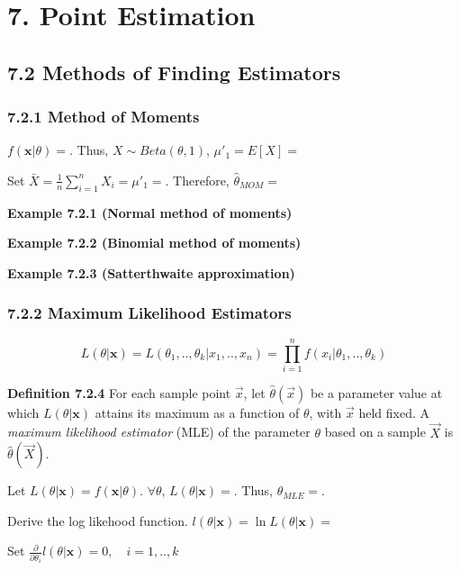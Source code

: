 \documentclass[6pt,Portrait]{article}
\begin{document}
\hypertarget{point-estimation}{%
\section{7. Point Estimation}\label{point-estimation}}

\hypertarget{methods-of-finding-estimators}{%
\subsection{7.2 Methods of Finding
Estimators}\label{methods-of-finding-estimators}}

\hypertarget{MOM}{%
\subsubsection{7.2.1 Method of Moments}\label{MOM}}

\(f(\mathbf{x}|\theta)=\). Thus, \(X\sim Beta(\theta,1)\),
\(\mu'_1=E[X]=\)

Set \(\bar X=\frac1n\sum_{i=1}^nX_i=\mu'_1=\). Therefore,
\(\hat\theta_{MOM}=\)

\textbf{Example 7.2.1 (Normal method of moments)}

\textbf{Example 7.2.2 (Binomial method of moments)}

\textbf{Example 7.2.3 (Satterthwaite approximation)}

\hypertarget{MLE}{%
\subsubsection{7.2.2 Maximum Likelihood Estimators}\label{MLE}}

\[L(\theta|\mathbf{x})=L(\theta_1,..,\theta_k|x_1,..,x_n)=\prod_{i=1}^n f(x_i|\theta_1,..,\theta_k)\]

\textbf{Definition 7.2.4} For each sample point \(\vec x\), let
\(\hat\theta(\vec x)\) be a parameter value at which
\(L(\theta|\mathbf{x})\) attains its maximum as a function of
\(\theta\), with \(\vec x\) held fixed. A \emph{maximum likelihood
estimator} (MLE) of the parameter \(\theta\) based on a sample
\(\vec X\) is \(\hat\theta(\vec X)\).

Let \(L(\theta|\mathbf{x})=f(\mathbf{x}|\theta)\). \(\forall\theta\),
\(L(\theta|\mathbf{x})=\). Thus, \(\theta_{MLE}=\).

Derive the log likehood function.
\(l(\theta|\mathbf{x})=\ln L(\theta|\mathbf{x})=\)

Set
\(\frac{\partial}{\partial\theta_i}l(\theta|\mathbf{x})=0,\quad i=1,..,k\)
\end{document}
